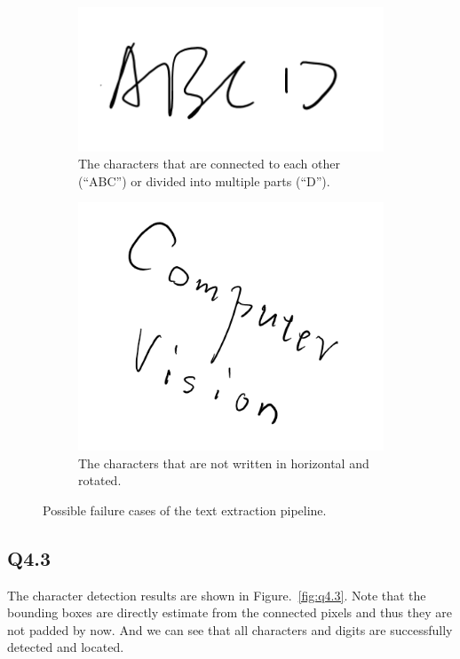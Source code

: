 \documentclass[11pt]{article}
\begin{document}
\begin{figure}[h!]
    \begin{subfigure}{.495\textwidth}
      \centering
      \includegraphics[width=.5\linewidth]{../results/q4_1a.png}
      \caption{The characters that are connected to each other (``ABC'') or divided into multiple parts (``D''). }
    \end{subfigure}
    \begin{subfigure}{.495\textwidth}
      \centering
      \includegraphics[width=.5\linewidth]{../results/q4_1b.png}
      \caption{The characters that are not written in horizontal and rotated. }
    \end{subfigure}\hfill
    \caption{Possible failure cases of the text extraction pipeline. }
    \label{fig:q4.1}
\end{figure}

\newpage

\subsection*{Q4.3}

The character detection results are shown in Figure.~\ref{fig:q4.3}. Note that the bounding boxes are directly estimate from the connected pixels and thus they are not padded by now. And we can see that all characters and digits are successfully detected and located.
\end{document}
